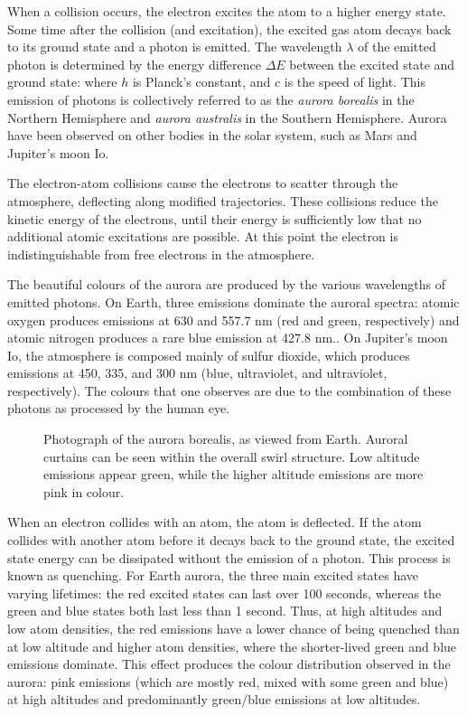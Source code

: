 \documentclass[twocolumn]{article}
\renewcommand{\insertfigure}[3]{\begin{figure}[tbh]
\centering
	\makebox[\columnwidth][c]{
	\texttt{[image: \#1]}
	}
\caption{#3}
\label{#1}
\end{figure}}
\begin{document}
When a collision occurs, the electron excites the atom to a higher energy state.  Some time after the collision (and excitation), the excited gas atom decays back to its ground state and a photon is emitted. The wavelength $\lambda$ of the emitted photon is determined by the energy difference $\Delta E$ between the excited state and ground state:
 where $h$ is Planck's constant, and $c$ is the speed of light.  This emission of photons is collectively referred to as the \emph{aurora borealis} in the Northern Hemisphere and \emph{aurora australis} in the Southern Hemisphere\cite{Baranoski2003}.  Aurora have been observed on other bodies in the solar system, such as Mars\cite{Dubinin2009,Soret2016} and Jupiter's moon Io\cite{Saur2000,Roth2014}.

The electron-atom collisions cause the electrons to scatter through the atmosphere, deflecting along modified trajectories\cite{Rees1992}.  These collisions reduce the kinetic energy of the electrons, until their energy is sufficiently low that no additional atomic excitations are possible. At this point the electron is indistinguishable from free electrons in the atmosphere.

The beautiful colours of the aurora are produced by the various wavelengths of emitted photons.  On Earth, three emissions dominate the auroral spectra: atomic oxygen produces emissions at 630 and 557.7 nm (red and green, respectively) and atomic nitrogen produces a rare blue emission at 427.8 nm.\cite{Sandahl2008,Semeter2003}.  On Jupiter's moon Io, the atmosphere is composed mainly of sulfur dioxide\cite{Saur2000}, which produces emissions at 450, 335, and 300 nm (blue, ultraviolet, and ultraviolet, respectively).\cite{Ajello2002}  The colours that one observes are due to the combination of these photons as processed by the human eye.

\insertfigure{../presentation/img/ab_swirls.jpg}{1.0}{Photograph of the aurora borealis, as viewed from Earth. Auroral curtains can be seen within the overall swirl structure. Low altitude emissions appear green, while the higher altitude emissions are more pink in colour.}

When an electron collides with an atom, the atom is deflected.  If the atom collides with another atom before it decays back to the ground state, the excited state energy can be dissipated without the emission of a photon\cite{Hunten1966}. This process is known as quenching. For Earth aurora, the three main excited states have varying lifetimes: the red excited states can last over 100 seconds, whereas the green and blue states both last less than 1 second. Thus, at high altitudes and low atom densities, the red emissions have a lower chance of being quenched than at low altitude and higher atom densities, where the shorter-lived green and blue emissions dominate.  This effect produces the colour distribution observed in the aurora: pink emissions (which are mostly red, mixed with some green and blue) at high altitudes and predominantly green/blue emissions at low altitudes.
\end{document}
